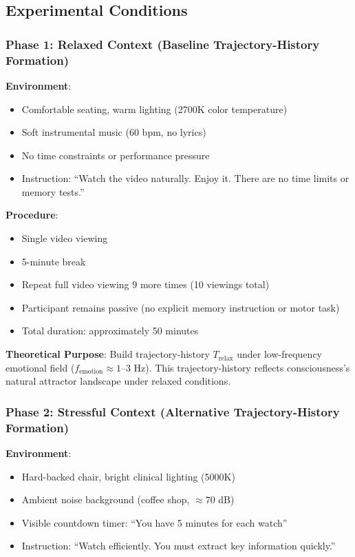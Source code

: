 \documentclass[12pt,a4paper]{article}
\theoremstyle{definition}
\begin{document}
\subsection{Experimental Conditions}

\subsubsection{Phase 1: Relaxed Context (Baseline Trajectory-History Formation)}

\textbf{Environment}:
\begin{itemize}
  \item Comfortable seating, warm lighting (2700K color temperature)
  \item Soft instrumental music (60 bpm, no lyrics)
  \item No time constraints or performance pressure
  \item Instruction: ``Watch the video naturally. Enjoy it. There are no time limits or memory tests.''
\end{itemize}

\textbf{Procedure}:
\begin{itemize}
  \item Single video viewing
  \item 5-minute break
  \item Repeat full video viewing 9 more times (10 viewings total)
  \item Participant remains passive (no explicit memory instruction or motor task)
  \item Total duration: approximately 50 minutes
\end{itemize}

\textbf{Theoretical Purpose}: Build trajectory-history $T_{\text{relax}}$ under low-frequency emotional field ($f_{\text{emotion}} \approx 1$--$3$ Hz). This trajectory-history reflects consciousness's natural attractor landscape under relaxed conditions.

\subsubsection{Phase 2: Stressful Context (Alternative Trajectory-History Formation)}

\textbf{Environment}:
\begin{itemize}
  \item Hard-backed chair, bright clinical lighting (5000K)
  \item Ambient noise background (coffee shop, $\approx 70$ dB)
  \item Visible countdown timer: ``You have 5 minutes for each watch''
  \item Instruction: ``Watch efficiently. You must extract key information quickly.''
\end{itemize}
\end{document}

